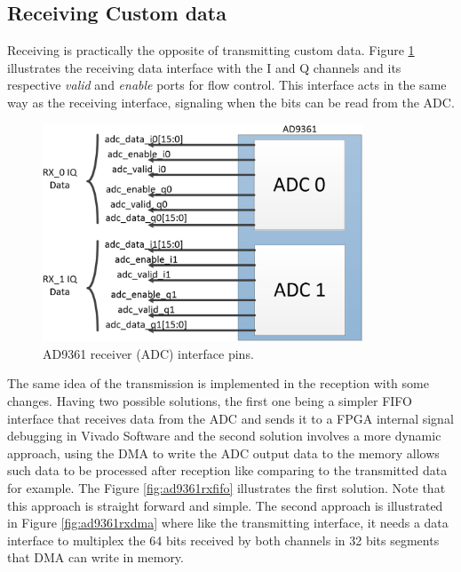 \subsection{Receiving Custom data}

Receiving is practically the opposite of transmitting custom data. Figure
\ref{fig:rxpins} illustrates the receiving data interface with the I and Q
channels and its respective \emph{valid} and \emph{enable} ports for flow
control. This interface acts in the same way as the receiving interface,
signaling when the bits can be read from the ADC.

\begin{figure}[htbp]
    \centering
    \includegraphics[width=0.85\textwidth]{./figures/ad9361rx_pins}
    \caption{ AD9361 receiver (ADC) interface pins.
    \label{fig:rxpins}}
\end{figure}

The same idea of the transmission is implemented in the reception with some
changes. Having two possible solutions, the first one being a simpler FIFO
interface that receives data from the ADC and sends it to a FPGA internal signal
debugging in Vivado Software and the second solution involves a more dynamic
approach, using the DMA to write the ADC output data to the memory allows such
data to be processed after reception like comparing to the transmitted data for
example. The Figure \ref{fig:ad9361rxfifo} illustrates the first solution. Note
that this approach is straight forward and simple. The second approach is
illustrated in Figure \ref{fig:ad9361rxdma} where like the transmitting
interface, it needs a data interface to multiplex the 64 bits received by both
channels in 32 bits segments that DMA can write in memory.


